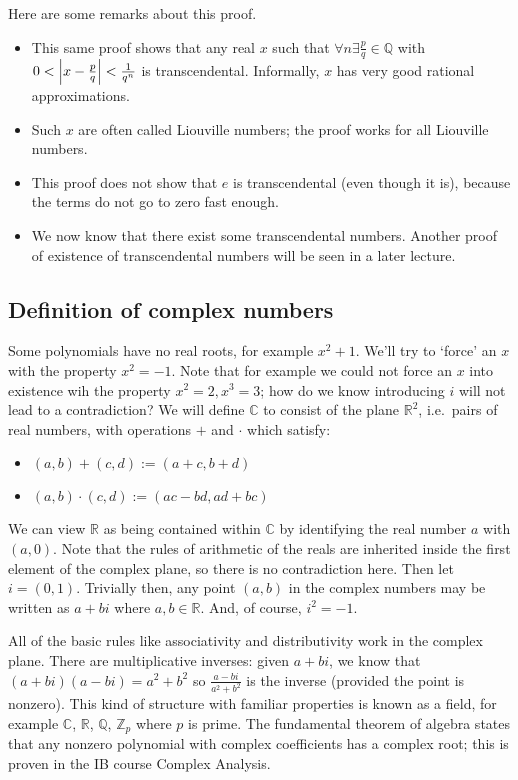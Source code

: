 Here are some remarks about this proof.
\begin{itemize}
	\item This same proof shows that any real \(x\) such that \(\forall n \exists \frac{p}{q}\in \mathbb Q\) with \(0 < \abs{x - \frac{p}{q}} < \frac{1}{q^n}\) is transcendental.
	      Informally, \(x\) has very good rational approximations.
	\item Such \(x\) are often called Liouville numbers; the proof works for all Liouville numbers.
	\item This proof does not show that \(e\) is transcendental (even though it is), because the terms do not go to zero fast enough.
	\item We now know that there exist some transcendental numbers.
	      Another proof of existence of transcendental numbers will be seen in a later lecture.
\end{itemize}

\subsection{Definition of complex numbers}
Some polynomials have no real roots, for example \(x^2 + 1\).
We'll try to `force' an \(x\) with the property \(x^2 = -1\).
Note that for example we could not force an \(x\) into existence wih the property \(x^2=2, x^3=3\); how do we know introducing \(i\) will not lead to a contradiction?
We will define \(\mathbb C\) to consist of the plane \(\mathbb R^2\), i.e.\ pairs of real numbers, with operations \(+\) and \(\cdot\) which satisfy:
\begin{itemize}
	\item \((a,b)+(c,d) := (a+c, b+d)\)
	\item \((a,b)\cdot(c,d) := (ac-bd, ad+bc)\)
\end{itemize}
We can view \(\mathbb R\) as being contained within \(\mathbb C\) by identifying the real number \(a\) with \((a, 0)\).
Note that the rules of arithmetic of the reals are inherited inside the first element of the complex plane, so there is no contradiction here.
Then let \(i=(0,1)\).
Trivially then, any point \((a, b)\) in the complex numbers may be written as \(a+bi\) where \(a, b \in \mathbb R\).
And, of course, \(i^2 = -1\).

All of the basic rules like associativity and distributivity work in the complex plane.
There are multiplicative inverses: given \(a+bi\), we know that \((a+bi)(a-bi) = a^2 + b^2\) so \(\frac{a-bi}{a^2 + b^2}\) is the inverse (provided the point is nonzero).
This kind of structure with familiar properties is known as a field, for example \(\mathbb C\), \(\mathbb R\), \(\mathbb Q\), \(\mathbb Z_p\) where \(p\) is prime.
The fundamental theorem of algebra states that any nonzero polynomial with complex coefficients has a complex root; this is proven in the IB course Complex Analysis.
